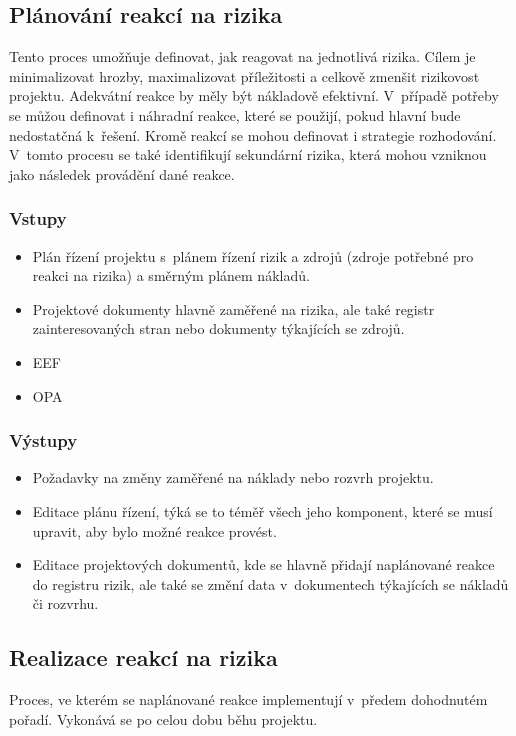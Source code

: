 \subsection*{Plánování reakcí na rizika}

Tento proces umožňuje definovat, jak reagovat na jednotlivá rizika.  Cílem je minimalizovat hrozby, maximalizovat příležitosti a celkově zmenšit rizikovost projektu. Adekvátní reakce by měly být nákladově efektivní. V~případě potřeby se můžou definovat i náhradní reakce, které se použijí, pokud hlavní bude nedostatčná k~řešení. Kromě reakcí se mohou definovat i strategie rozhodování. V~tomto procesu se také identifikují sekundární rizika, která mohou vzniknou jako následek provádění dané reakce. 

\subsubsection*{Vstupy}
\begin{itemize}
    \item Plán řízení projektu s~plánem řízení rizik a zdrojů (zdroje potřebné pro reakci na rizika) a směrným plánem nákladů.
    \item Projektové dokumenty hlavně zaměřené na rizika, ale také registr zainteresovaných stran nebo dokumenty týkajících se zdrojů.
    \item EEF
    \item OPA
\end{itemize}
\subsubsection*{Výstupy}
\begin{itemize}
    \item Požadavky na změny zaměřené na náklady nebo rozvrh projektu.
    \item Editace plánu řízení, týká se to téměř všech jeho komponent, které se musí upravit, aby bylo možné reakce provést.
    \item Editace projektových dokumentů, kde se hlavně přidají naplánované reakce do registru rizik, ale také se změní data v~dokumentech týkajících se nákladů či rozvrhu.
\end{itemize}


\subsection*{Realizace reakcí na rizika}

Proces, ve kterém se naplánované reakce implementují v~předem dohodnutém pořadí. Vykonává se po celou dobu běhu projektu.

